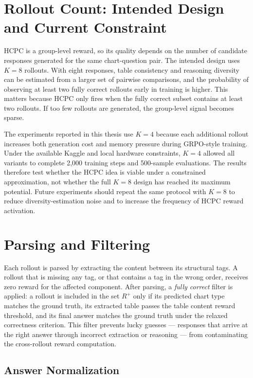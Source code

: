 \documentclass{iutbscthesis}
\begin{document}
\section{Rollout Count: Intended Design and Current Constraint}

HCPC is a group-level reward, so its quality depends on the number of candidate responses generated for the same chart-question pair. The intended design uses $K=8$ rollouts. With eight responses, table consistency and reasoning diversity can be estimated from a larger set of pairwise comparisons, and the probability of observing at least two fully correct rollouts early in training is higher. This matters because HCPC only fires when the fully correct subset contains at least two rollouts. If too few rollouts are generated, the group-level signal becomes sparse.

The experiments reported in this thesis use $K=4$ because each additional rollout increases both generation cost and memory pressure during GRPO-style training. Under the available Kaggle and local hardware constraints, $K=4$ allowed all variants to complete 2,000 training steps and 500-sample evaluations. The results therefore test whether the HCPC idea is viable under a constrained approximation, not whether the full $K=8$ design has reached its maximum potential. Future experiments should repeat the same protocol with $K=8$ to reduce diversity-estimation noise and to increase the frequency of HCPC reward activation.

\section{Parsing and Filtering}

Each rollout is parsed by extracting the content between its structural tags. A rollout that is missing any tag, or that contains a tag in the wrong order, receives zero reward for the affected component. After parsing, a \emph{fully correct} filter is applied: a rollout is included in the set $R^+$ only if its predicted chart type matches the ground truth, its extracted table passes the table content reward threshold, and its final answer matches the ground truth under the relaxed correctness criterion. This filter prevents lucky guesses --- responses that arrive at the right answer through incorrect extraction or reasoning --- from contaminating the cross-rollout reward computation.

\subsection{Answer Normalization}
\end{document}
